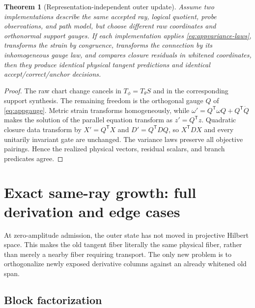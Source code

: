 \documentclass[10pt,twocolumn]{article}
\newtheorem{theorem}{Theorem}[section]
\theoremstyle{definition}
\theoremstyle{remark}
\begin{document}
\begin{theorem}[Representation-independent outer update]
\label{thm:representationindependent}
Assume two implementations describe the same accepted ray, logical quotient,
probe observations, and path model, but choose different raw coordinates and
orthonormal support gauges.  If each implementation applies
\eqref{eq:appvariance-laws}, transforms the strain by congruence, transforms
the connection by its inhomogeneous gauge law, and compares closure residuals
in whitened coordinates, then they produce identical physical tangent
predictions and identical accept/correct/anchor decisions.
\end{theorem}
\begin{proof}
The raw chart change cancels in $T_\phi=T_\theta S$ and in the corresponding
support synthesis.  The remaining freedom is the orthogonal gauge $Q$ of
\eqref{eq:appgauge}.  Metric strain transforms homogeneously, while
$\omega'=Q^{\mathsf T}\omega Q+Q^{\mathsf T}\dot Q$ makes the solution of the
parallel equation transform as $z'=Q^{\mathsf T}z$.  Quadratic closure data
transform by $X'=Q^{\mathsf T}X$ and
$D'=Q^{\mathsf T}DQ$, so $X^{\mathsf T}DX$ and every unitarily invariant gate
are unchanged.  The variance laws preserve all objective pairings.  Hence
the realized physical vectors, residual scalars, and branch predicates agree.
\end{proof}

\section{Exact same-ray growth: full derivation and edge cases}
\label{app:growthproof}

At zero-amplitude admission, the outer state has not moved in projective
Hilbert space.  This makes the old tangent fiber literally the same physical
fiber, rather than merely a nearby fiber requiring transport.  The only new
problem is to orthogonalize newly exposed derivative columns against an
already whitened old span.

\subsection{Block factorization}
\end{document}
